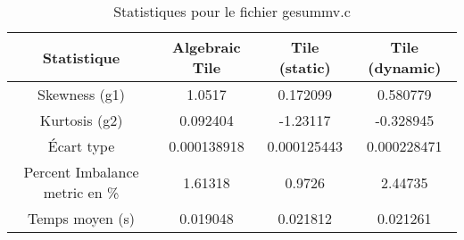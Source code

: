 \documentclass{article}
\begin{document}
\begin{table}[htbp]
  \centering
  \caption{Statistiques pour le fichier gesummv.c}
  \begin{tabular}{|c|c|c|c|}
    \hline
    Statistique & Algebraic Tile & Tile (static) & Tile (dynamic) \\ 
    \hline
    Skewness (g1) & 1.0517 & 0.172099 & 0.580779 \\ 
    Kurtosis (g2) & 0.092404 & -1.23117 & -0.328945 \\ 
    Écart type & 0.000138918 & 0.000125443 & 0.000228471\\ 
    Percent Imbalance metric en \% & 1.61318 & 0.9726 & 2.44735\\ 
    Temps moyen (s) & 0.019048 & 0.021812 & 0.021261 \\ 
    \hline
  \end{tabular}
\end{table}
\newpage
\end{document}
